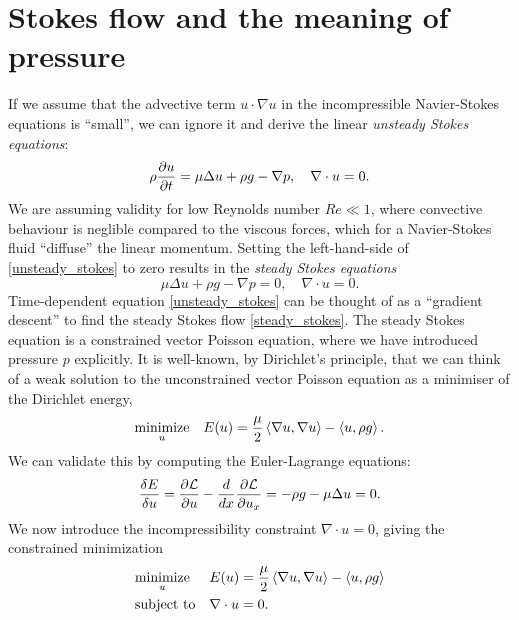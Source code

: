 \section{Stokes flow and the meaning of pressure}\label{pressure_derivation}
If we assume that the advective term $u\cdot \nabla u$ in the incompressible Navier-Stokes equations is ``small'',
we can ignore it and derive the linear \textit{unsteady Stokes equations}:
\begin{equation}\label{unsteady_stokes}
    \rho\frac{\partial u}{\partial t} = \mu\Delta u + \rho g - \nabla p, \quad \nabla\cdot u = 0.
\end{equation}
We are assuming validity for low Reynolds number $Re \ll 1$, where convective behaviour is neglible compared to the viscous forces, which for a
Navier-Stokes fluid ``diffuse'' the linear momentum. Setting the left-hand-side of \eqref{unsteady_stokes} to zero results in the \textit{steady Stokes equations}
\begin{equation}\label{steady_stokes}
    \mu\Delta u + \rho g - \nabla p = 0,\quad \nabla\cdot u = 0.
\end{equation}
Time-dependent equation \eqref{unsteady_stokes} can be thought of as a ``gradient descent'' to find the steady Stokes flow \eqref{steady_stokes}.
The steady Stokes equation is a constrained vector Poisson equation, where we have introduced pressure $p$ explicitly.
It is well-known, by Dirichlet's principle, that we can think
of a weak solution to the unconstrained vector Poisson equation as a minimiser of the Dirichlet energy,
\begin{equation}
\begin{aligned}
& \underset{u}{\text{minimize}}
& & E(u) =  \frac{\mu}{2} \left<\nabla u, \nabla u\right> - \left<u, \rho g\right>.\\
\end{aligned}
\end{equation}
\newcommand{\energygradient}{\frac{\delta E}{\delta u}}
We can validate this by computing the Euler-Lagrange equations:
\begin{align*}
    \frac{\delta E}{\delta u} = \frac{\partial \mathcal{L}}{\partial u} - \frac{d}{dx}\frac{\partial \mathcal{L}}{\partial u_x}
                              = -\rho g - \mu\Delta u = 0.
\end{align*}
We now introduce the incompressibility constraint $\nabla \cdot u = 0$, giving the constrained minimization
\begin{equation}\label{stokes_flow_optimization}
\begin{aligned}
& \underset{u}{\text{minimize}}
& & E(u) =  \frac{\mu}{2} \left<\nabla u, \nabla u\right> - \left<u, \rho g\right>\\
& \text{subject to}
& & \nabla\cdot u = 0.
\end{aligned}
\end{equation}
